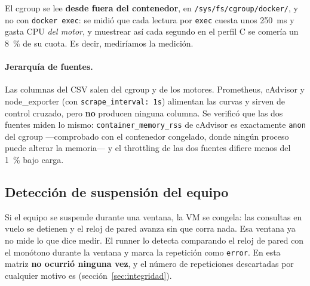 El cgroup se lee \textbf{desde fuera del contenedor}, en
\texttt{/sys/fs/cgroup/docker/}, y no con \texttt{docker exec}: se midió que cada
lectura por \texttt{exec} cuesta unos 250~ms y gasta CPU \emph{del motor}, y
muestrear así cada segundo en el perfil C se comería un 8~\% de su cuota. Es
decir, mediríamos la medición.

\paragraph{Jerarquía de fuentes.}
Las columnas del CSV salen del cgroup y de los motores. Prometheus, cAdvisor y
node\_exporter (con \texttt{scrape\_interval: 1s}) alimentan las curvas y sirven
de control cruzado, pero \textbf{no} producen ninguna columna. Se verificó que
las dos fuentes miden lo mismo: \texttt{container\_memory\_rss} de cAdvisor es
exactamente \texttt{anon} del cgroup —comprobado con el contenedor congelado, donde
ningún proceso puede alterar la memoria— y el throttling de las dos fuentes
difiere menos del 1~\% bajo carga.

\subsection{Detección de suspensión del equipo}

Si el equipo se suspende durante una ventana, la VM se congela: las consultas en
vuelo se detienen y el reloj de pared avanza sin que corra nada. Esa ventana ya no
mide lo que dice medir. El runner lo detecta comparando el reloj de pared con el
monótono durante la ventana y marca la repetición como \texttt{error}. En esta
matriz \textbf{no ocurrió ninguna vez}, y el número de repeticiones descartadas
por cualquier motivo es \cifraDescartadas{} (sección~\ref{sec:integridad}).
